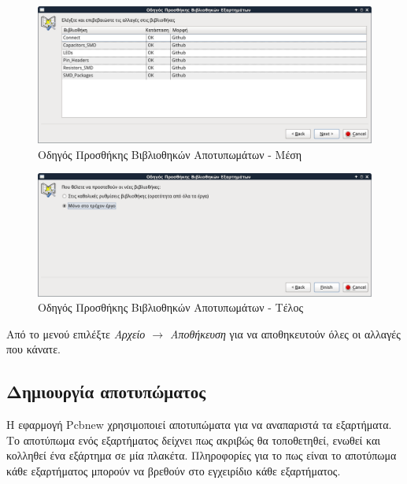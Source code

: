 \documentclass[a4paper]{article}
\begin{document}
\begin{figure}
  \begin{center}
    \includegraphics[width=.9\textwidth]{img/pcb-dial-libwiz2.png}
    \caption{Οδηγός Προσθήκης Βιβλιοθηκών Αποτυπωμάτων - Μέση}
    \label{fig:pcb-dial-libwiz2}
  \end{center}
\end{figure}

\begin{figure}
  \begin{center}
    \includegraphics[width=.9\textwidth]{img/pcb-dial-libwiz3.png}
    \caption{Οδηγός Προσθήκης Βιβλιοθηκών Αποτυπωμάτων - Τέλος}
    \label{fig:pcb-dial-libwiz3}
  \end{center}
\end{figure}

Από το μενού επιλέξτε \textit{Αρχείο $\rightarrow$ Αποθήκευση} για να αποθηκευτούν όλες οι αλλαγές που κάνατε.


\subsection{Δημιουργία αποτυπώματος}
Η εφαρμογή Pcbnew χρησιμοποιεί αποτυπώματα για να αναπαριστά τα εξαρτήματα. Το αποτύπωμα ενός εξαρτήματος δείχνει πως ακριβώς θα τοποθετηθεί, ενωθεί και κολληθεί ένα εξάρτημα σε μία πλακέτα. Πληροφορίες για το πως είναι το αποτύπωμα κάθε εξαρτήματος μπορούν να βρεθούν στο εγχειρίδιο κάθε εξαρτήματος. 
\end{document}
